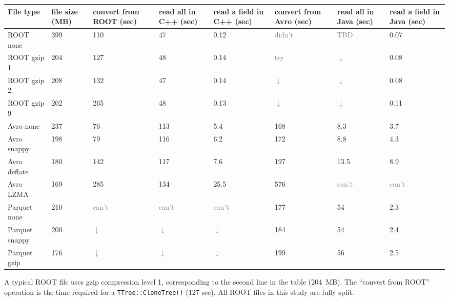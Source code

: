 \documentclass{article}
\begin{document}
\noindent\begin{center}
\begin{tabular}{p{2.4 cm} | P{1.2 cm} P{1.9 cm} P{1.2 cm} P{1.8 cm} P{1.9 cm} P{1.2 cm} P{1.8 cm}}
File type & file size (MB) & convert from ROOT (sec) & read all in C++ (sec) & read a field in C++ (sec) & convert from Avro (sec) & read all in Java (sec) & read a field in Java (sec)      \\\hline
ROOT none     & 399 &          110 &           47 &         0.12 &       \textcolor{gray}{didn't} &          \textcolor{gray}{TBD} & 0.07 \\
ROOT gzip 1   & 204 &          127 &           48 &         0.14 &          \textcolor{gray}{try} & \textcolor{gray}{$\downarrow$} & 0.08 \\
ROOT gzip 2   & 208 &          132 &           47 &         0.14 & \textcolor{gray}{$\downarrow$} & \textcolor{gray}{$\downarrow$} & 0.08 \\
ROOT gzip 9   & 202 &          265 &           48 &         0.13 & \textcolor{gray}{$\downarrow$} & \textcolor{gray}{$\downarrow$} & 0.11 \\\hline
Avro none     & 237 &           76 &          113 &          5.4 &          168 &          8.3 &          3.7 \\
Avro snappy   & 198 &           79 &          116 &          6.2 &          172 &          8.8 &          4.3 \\
Avro deflate  & 180 &          142 &          117 &          7.6 &          197 &         13.5 &          8.9 \\
Avro LZMA     & 169 &          285 &          134 &         25.5 &          576 &        \textcolor{gray}{can't} &        \textcolor{gray}{can't} \\\hline
Parquet none  & 210 &        \textcolor{gray}{can't} &        \textcolor{gray}{can't} &        \textcolor{gray}{can't} &          177 &           54 &          2.3 \\
Parquet snappy  & 200 & \textcolor{gray}{$\downarrow$} & \textcolor{gray}{$\downarrow$} & \textcolor{gray}{$\downarrow$} &          184 &           54 &          2.4 \\
Parquet gzip  & 176 & \textcolor{gray}{$\downarrow$} & \textcolor{gray}{$\downarrow$} & \textcolor{gray}{$\downarrow$} &          199 &           56 &          2.5 \\
\end{tabular}
\end{center}

A typical ROOT file uses gzip compression level 1, corresponding to the second line in the table (204~MB). The ``convert from ROOT'' operation is the time required for a {\tt TTree::CloneTree()} (127 sec). All ROOT files in this study are fully split.
\end{document}
